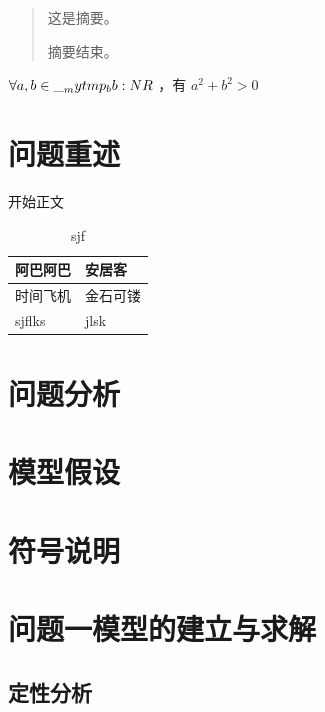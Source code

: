 \documentclass{MMCStyle}
\begin{document}
\nocite{*}
\begin{abstract}
这是摘要。

\zhlipsum[2]

摘要结束。
\end{abstract}

\tableofcontents\newpage
\clearpage
{}
\pagestyle{fancy}

$\forall a, b \in\__mytmp_bb:N R$ ，有 $a^2 + b^2 > 0$



\section{问题重述}


开始正文

\begin{table}[!htbp]
\centering
\caption{sjf}
\begin{tabularx}{\textwidth}{Y Y}
\toprule
阿巴阿巴 & 安居客 \\
\midrule
时间飞机 & 金石可镂 \\
sjflks & jlsk \\
\bottomrule
\end{tabularx}
\end{table}

\section{问题分析}

\zhlipsum[8]

\section{模型假设}

\zhlipsum[1]

\section{符号说明}

\zhlipsum[1]

\section{问题一模型的建立与求解}

\zhlipsum[1]

\subsection{定性分析}
\end{document}
